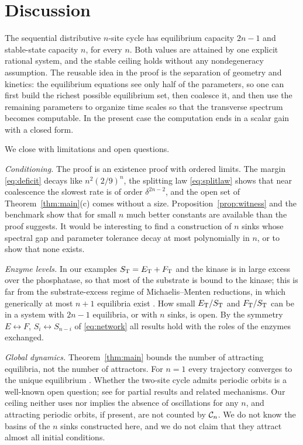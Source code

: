 \section{Discussion}\label{sec:discussion}
The sequential distributive \(n\)-site cycle has equilibrium capacity \(2n-1\) and stable-state
capacity \(n\), for every \(n\). Both values are attained by one explicit rational system, and
the stable ceiling holds without any nondegeneracy assumption. The reusable idea in the proof
is the separation of geometry and kinetics: the equilibrium equations see only half of the
parameters, so one can first build the richest possible equilibrium set, then coalesce it, and
then use the remaining parameters to organize time scales so that the transverse spectrum
becomes computable. In the present case the computation ends in a scalar gain with a closed
form.

We close with limitations and open questions.

\emph{Conditioning.} The proof is an existence proof with ordered limits. The margin
\eqref{eq:deficit} decays like \(n^2(2/9)^n\), the splitting law \eqref{eq:splitlaw} shows that
near coalescence the slowest rate is of order \(\delta^{2n-2}\), and the open set of
Theorem~\ref{thm:main}(c) comes without a size. Proposition~\ref{prop:witness} and the
benchmark show that for small \(n\) much better constants are available than the proof
suggests. It would be interesting to find a construction of \(n\) sinks whose spectral gap and
parameter tolerance decay at most polynomially in \(n\), or to show that none exists.

\emph{Enzyme levels.} In our examples \(S_{\mathrm T}=E_{\mathrm T}+F_{\mathrm T}\) and the kinase is in large excess over
the phosphatase, so that most of the substrate is bound to the kinase; this is far from the
substrate-excess regime of Michaelis--Menten reductions, in which generically at most \(n+1\)
equilibria exist \cite[Theorem~4]{WangSontag2008}. How small \(E_{\mathrm T}/S_{\mathrm T}\) and \(F_{\mathrm T}/S_{\mathrm T}\) can be
in a system with \(2n-1\) equilibria, or with \(n\) sinks, is open. By the symmetry
\(E\leftrightarrow F\), \(S_i\leftrightarrow S_{n-i}\) of \eqref{eq:network} all results hold
with the roles of the enzymes exchanged.

\emph{Global dynamics.} Theorem~\ref{thm:main} bounds the number of attracting equilibria, not
the number of attractors. For \(n=1\) every trajectory converges to the unique equilibrium
\cite{AngeliSontag2008}. Whether the two-site cycle admits periodic orbits is a
well-known open question; see \cite{CMS2019,CFM2020,ConradiMincheva2024} for partial results
and related mechanisms. Our ceiling neither uses nor implies the absence of oscillations for
any \(n\), and attracting periodic orbits, if present, are not counted by \(\mathcal C_n\). We do not
know the basins of the \(n\) sinks constructed here, and we do
not claim that they attract almost all initial conditions.

